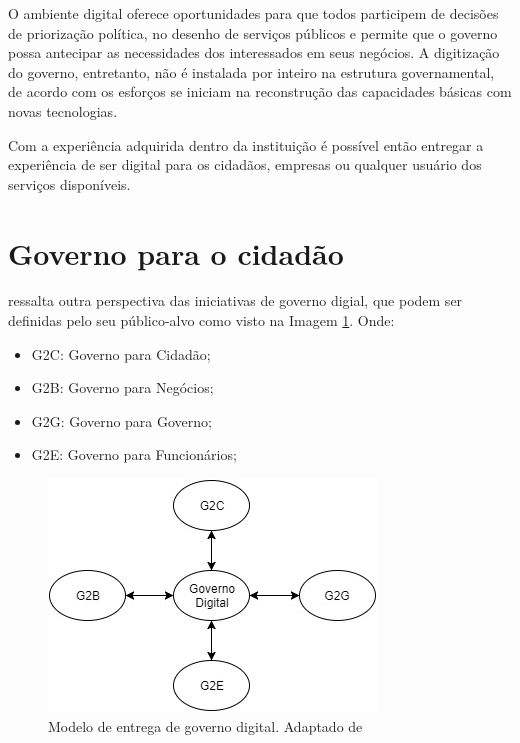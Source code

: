 O ambiente digital oferece oportunidades para que todos participem de decisões de priorização política, no desenho de serviços públicos e permite que o governo possa antecipar as necessidades dos interessados em seus negócios. A digitização do governo, entretanto, não é instalada por inteiro na estrutura governamental, de acordo com \cite{mckinsey2016} os esforços se iniciam na reconstrução das capacidades básicas com novas tecnologias. 

Com a experiência adquirida dentro da instituição é possível então entregar a experiência de ser digital para os cidadãos, empresas ou qualquer usuário dos serviços disponíveis.

\section{Governo para o cidadão}

\cite[p.~380]{chen2009} ressalta outra perspectiva das iniciativas de governo digial, que podem ser definidas pelo seu público-alvo como visto na Imagem \ref{img:egovdeliverymodel}. Onde:
\begin{itemize}
	\item G2C: Governo para Cidadão;
	\item G2B: Governo para Negócios;
	\item G2G: Governo para Governo;
	\item G2E: Governo para Funcionários;
\end{itemize}

\begin{figure}[hbp]
	\centering
	\includegraphics[width=.8\linewidth]{figuras/egovdeliverymodel.jpg}
	\caption{Modelo de entrega de governo digital. Adaptado de \cite{chen2009}}
	\label{img:egovdeliverymodel}
\end{figure}

